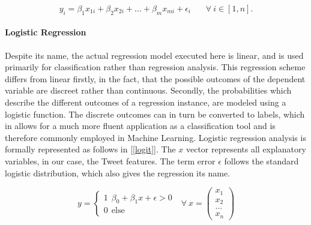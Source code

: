 	\begin{equation}
		y_i = \beta_1 x_{1i}+ \beta_2 x_{2i} + ... + \beta_m x_{mi} + \epsilon_i \ \ \ \ \ \ \ \ 
		\forall \ i \in [1,n].
		\label{lin_reg}
	\end{equation}
	
	\paragraph{Logistic Regression} Despite its name, the actual regression model executed here is linear, and is used primarily for classification rather than regression analysis. This regression scheme differs from linear firstly, in the fact, that the possible outcomes of the dependent variable are discreet rather than continuous. Secondly, the probabilities which describe the different outcomes of a regression instance, are modeled using a logistic function. The discrete outcomes can in turn be converted to labels, which in allows for a much more fluent application as a classification tool and is therefore commonly employed in  Machine Learning. Logistic regression analysis is formally represented as follows in  [\ref{logit}]. The $x$ vector represents all explanatory variables, in our case, the Tweet features. The term error $\epsilon$ follows the standard logistic distribution, which also gives the regression its name. 
	
	\begin{equation}
		y = 
		\begin{cases}
		1 \ \  \beta_0 + \beta_1 x + \epsilon > 0 \\
		0 \ \  \text{else } 
		\end{cases} \text{         } \forall \  x = 
		\begin{pmatrix}x_1\\x_2\\...\\x_n \end{pmatrix}
		\label{logit}
	\end{equation}